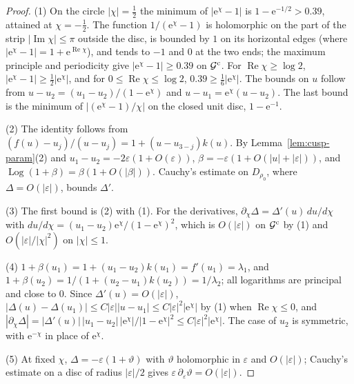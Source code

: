 \documentclass[11pt]{amsart}
\theoremstyle{definition}
\newcommand{\eee}{\mathrm{e}}
\begin{document}
\begin{proof}
(1) On the circle $|\chi|=\tfrac12$ the minimum of $|\eee^\chi-1|$ is
$1-\eee^{-1/2}>0.39$, attained at $\chi=-\tfrac12$.  The function
$1/(\eee^\chi-1)$ is holomorphic on the part of the strip
$|\operatorname{Im}\chi|\le\pi$ outside the disc, is bounded by $1$ on its horizontal
edges (where $|\eee^\chi-1|=1+\eee^{\operatorname{Re}\chi}$), and tends to $-1$ and $0$ at
the two ends; the maximum principle and periodicity give
$|\eee^\chi-1|\ge0.39$ on $\mathcal G^{\rm c}$.  For $\operatorname{Re}\chi\ge\log2$,
$|\eee^\chi-1|\ge\tfrac12|\eee^\chi|$, and for $0\le\operatorname{Re}\chi\le\log2$,
$0.39\ge\tfrac16|\eee^\chi|$.  The bounds on $u$ follow from
$u-u_2=(u_1-u_2)/(1-\eee^\chi)$ and $u-u_1=\eee^\chi(u-u_2)$.  The last bound
is the minimum of $|(\eee^\chi-1)/\chi|$ on the closed unit disc,
$1-\eee^{-1}$.

(2) The identity follows from $(f(u)-u_j)/(u-u_j)=1+(u-u_{3-j})k(u)$.  By
Lemma~\ref{lem:cusp-param}(2) and $u_1-u_2=-2\varepsilon(1+O(\varepsilon))$,
$\beta=-\varepsilon(1+O(|u|+|\varepsilon|))$, and $\operatorname{Log}(1+\beta)=\beta(1+O(|\beta|))$.
Cauchy's estimate on $D_{\rho_0}$, where $\Delta=O(|\varepsilon|)$, bounds $\Delta'$.

(3) The first bound is (2) with (1).  For the derivatives,
$\partial_\chi\Delta=\Delta'(u)\,du/d\chi$ with
$du/d\chi=(u_1-u_2)\eee^\chi/(1-\eee^\chi)^2$, which is $O(|\varepsilon|)$ on
$\mathcal G^{\rm c}$ by (1) and $O(|\varepsilon|/|\chi|^2)$ on $|\chi|\le1$.

(4) $1+\beta(u_1)=1+(u_1-u_2)k(u_1)=f'(u_1)=\lambda_1$, and
$1+\beta(u_2)=1/(1+(u_2-u_1)k(u_2))=1/\lambda_2$; all logarithms are
principal and close to $0$.  Since $\Delta'(u)=O(|\varepsilon|)$,
$|\Delta(u)-\Delta(u_1)|\le C|\varepsilon||u-u_1|\le C|\varepsilon|^2|\eee^\chi|$ by (1)
when $\operatorname{Re}\chi\le0$, and
$|\partial_\chi\Delta|=|\Delta'(u)|\,|u_1-u_2|\,|\eee^\chi|/|1-\eee^\chi|^2\le
C|\varepsilon|^2|\eee^\chi|$.  The case of $u_2$ is symmetric, with
$\eee^{-\chi}$ in place of $\eee^{\chi}$.

(5) At fixed $\chi$, $\Delta=-\varepsilon(1+\vartheta)$ with $\vartheta$ holomorphic in $\varepsilon$ and
$O(|\varepsilon|)$; Cauchy's estimate on a disc of radius $|\varepsilon|/2$ gives
$\varepsilon\,\partial_\varepsilon\vartheta=O(|\varepsilon|)$.
\end{proof}
\end{document}
